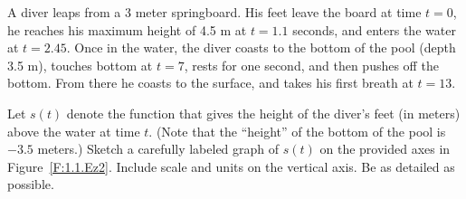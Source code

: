 \begin{exercises}
\begin{exerciseSolution}
\end{exerciseSolution}
\item A diver leaps from a 3 meter springboard.  His feet leave the board at time $t=0$, he reaches his maximum height of 4.5 m at $t = 1.1$ seconds, and enters the water at $t = 2.45$.  Once in the water, the diver coasts to the bottom of the pool (depth 3.5 m), touches bottom at $t=7$, rests for one second, and then pushes off the bottom.  From there he coasts to the surface, and takes his first breath at $t=13$.

\ba
  \item Let $s(t)$ denote the function that gives the height of the diver's feet (in meters) above the water at time $t$.  (Note that the ``height'' of the bottom of the pool is $-3.5$ meters.)  Sketch a carefully labeled graph of $s(t)$ on the provided axes in Figure~\ref{F:1.1.Ez2}.  Include scale and units on the vertical axis.  Be as detailed as possible.


\end{exercises}
